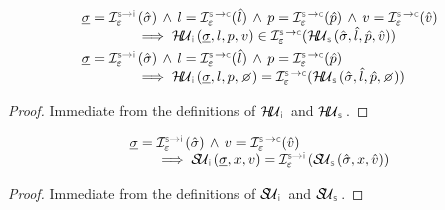 \begin{lemma}\label{lemma:soundiness:heap:update}
$$
\begin{array}{l}
\istate = \interpret{\symbinst}{\senv}(\sstate) \, \wedge \, 
   \loc = \interpret{\symbconc}{\senv}(\sloc)  \, \wedge \, 
   p = \interpret{\symbconc}{\senv}(\sexprp)  \, \wedge \, 
   \val = \interpret{\symbconc}{\senv}(\sexprv)   \\  \qquad \qquad
       \implies \hpupdt{\instrumented}(\istate, \loc, p, \val) \in \interpret{\symbconc}{\senv}(\hpupdt{\symbolic}(\sstate, \sloc, \sexprp, \sexprv)) \\[3pt]
%       
\istate = \interpret{\symbinst}{\senv}(\sstate) \, \wedge \, 
   \loc = \interpret{\symbconc}{\senv}(\sloc)  \, \wedge \, 
   p = \interpret{\symbconc}{\senv}(\sexprp) \\  \qquad \qquad
  \implies \hpupdt{\instrumented}(\istate, \loc, p, \none) = \interpret{\symbconc}{\senv}(\hpupdt{\symbolic}(\sstate, \sloc, \sexprp, \none)) 
\end{array}
$$
\end{lemma}
\begin{proof}
Immediate from the definitions of $\hpupdt{\instrumented}$ and $\hpupdt{\symbolic}$.
\end{proof}


\begin{lemma}\label{lemma:soundiness:store:update}
$$
\begin{array}{l}
\istate = \interpret{\symbinst}{\senv}(\sstate) \, \wedge \, 
   \val = \interpret{\symbconc}{\senv}(\sexprv) \\ \qquad   
       \implies \stupdt{\instrumented}(\istate, \jvar, \val) = \interpret{\symbinst}{\senv}(\stupdt{\symbolic}(\sstate, \jvar, \sexprv)) 
\end{array}
$$
\end{lemma}
\begin{proof}
Immediate from the definitions of $\stupdt{\instrumented}$ and $\stupdt{\symbolic}$.
\end{proof}


